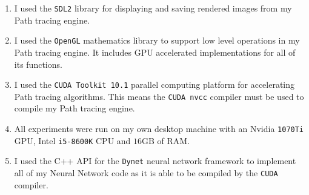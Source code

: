 \documentclass[ %
                    author={Callum Pearce},
                supervisor={Dr. Neill Campbell},
                    degree={MEng},
                     title={How effective are Temporal difference learning methods for reducing the number of zero contribution light paths while still accurately approximating Global Illumination in Path tracing?},
                  subtitle={},
                      type={research},
                      year={2019} ]{dissertation}
\begin{document}
\begin{comment}
{\bf A compulsory section, of at most $1$ page}
\vspace{1cm} 

\noindent
This section should present a detailed summary, in bullet point form, 
of any third-party resources (e.g., hardware and software components) 
used during the project.  Use of such resources is always perfectly 
acceptable: the goal of this section is simply to be clear about how
and where they are used, so that a clear assessment of your work can
result.  The content can focus on the project topic itself (rather,
for example, than including ``I used \mbox{\LaTeX} to prepare my 
dissertation''); an example is as follows:

\begin{quote}
\noindent
\begin{itemize}
\item I used the Java {\tt BigInteger} class to support my implementation 
      of RSA.
\item I used a parts of the OpenCV computer vision library to capture 
      images from a camera, and for various standard operations (e.g., 
      threshold, edge detection).
\item I used an FPGA device supplied by the Department, and altered it 
      to support an open-source UART core obtained from 
      \url{http://opencores.org/}.
\item The web-interface component of my system was implemented by 
      extending the open-source WordPress software available from
      \url{http://wordpress.org/}.
\end{itemize}
\end{quote}
\end{comment}


\begin{enumerate}
\item I used the \verb|SDL2|  library for displaying and saving rendered 
images from my Path tracing engine.

\item I used the \verb|OpenGL| mathematics library to support low level 
operations in my Path tracing engine. It includes GPU accelerated 
 implementations for all of its functions.
 
\item I used the \verb|CUDA Toolkit 10.1| parallel computing platform for
 accelerating Path tracing algorithms. This means the \verb|CUDA nvcc|
 compiler must be used to compile my Path tracing engine.

\item All experiments were run on my own desktop machine with an
Nvidia \verb|1070Ti| GPU, Intel \verb|i5-8600K| CPU and $16$GB of RAM.

\item I used the C++ API for the \verb|Dynet| neural network framework 
to implement all of my Neural Network code as it is able to be compiled
by the \verb|CUDA| compiler.
\end{enumerate}
\end{document}
